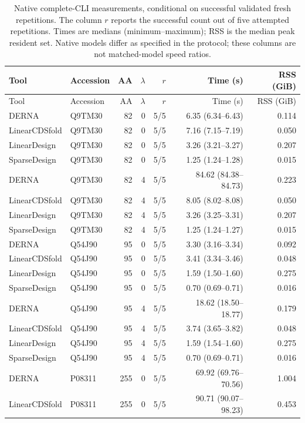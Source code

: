 \begin{longtable}{llrrrrr}
\caption{Native complete-CLI measurements, conditional on successful validated fresh repetitions. The column $r$ reports the successful count out of five attempted repetitions. Times are medians (minimum--maximum); RSS is the median peak resident set. Native models differ as specified in the protocol; these columns are not matched-model speed ratios.}\\
\toprule
Tool & Accession & AA & $\lambda$ & $r$ & Time (s) & RSS (GiB) \\
\midrule
\endfirsthead
\toprule Tool & Accession & AA & $\lambda$ & $r$ & Time (s) & RSS (GiB) \\ \midrule
\endhead
DERNA & Q9TM30 & 82 & 0 & 5/5 & 6.35 (6.34--6.43) & 0.114 \\
LinearCDSfold & Q9TM30 & 82 & 0 & 5/5 & 7.16 (7.15--7.19) & 0.050 \\
LinearDesign & Q9TM30 & 82 & 0 & 5/5 & 3.26 (3.21--3.27) & 0.207 \\
SparseDesign & Q9TM30 & 82 & 0 & 5/5 & 1.25 (1.24--1.28) & 0.015 \\
DERNA & Q9TM30 & 82 & 4 & 5/5 & 84.62 (84.38--84.73) & 0.223 \\
LinearCDSfold & Q9TM30 & 82 & 4 & 5/5 & 8.05 (8.02--8.08) & 0.050 \\
LinearDesign & Q9TM30 & 82 & 4 & 5/5 & 3.26 (3.25--3.31) & 0.207 \\
SparseDesign & Q9TM30 & 82 & 4 & 5/5 & 1.25 (1.24--1.27) & 0.015 \\
DERNA & Q54J90 & 95 & 0 & 5/5 & 3.30 (3.16--3.34) & 0.092 \\
LinearCDSfold & Q54J90 & 95 & 0 & 5/5 & 3.41 (3.34--3.46) & 0.048 \\
LinearDesign & Q54J90 & 95 & 0 & 5/5 & 1.59 (1.50--1.60) & 0.275 \\
SparseDesign & Q54J90 & 95 & 0 & 5/5 & 0.70 (0.69--0.71) & 0.016 \\
DERNA & Q54J90 & 95 & 4 & 5/5 & 18.62 (18.50--18.77) & 0.179 \\
LinearCDSfold & Q54J90 & 95 & 4 & 5/5 & 3.74 (3.65--3.82) & 0.048 \\
LinearDesign & Q54J90 & 95 & 4 & 5/5 & 1.59 (1.54--1.60) & 0.275 \\
SparseDesign & Q54J90 & 95 & 4 & 5/5 & 0.70 (0.69--0.71) & 0.016 \\
DERNA & P08311 & 255 & 0 & 5/5 & 69.92 (69.76--70.56) & 1.004 \\
LinearCDSfold & P08311 & 255 & 0 & 5/5 & 90.71 (90.07--98.23) & 0.453 \\

\end{longtable}
